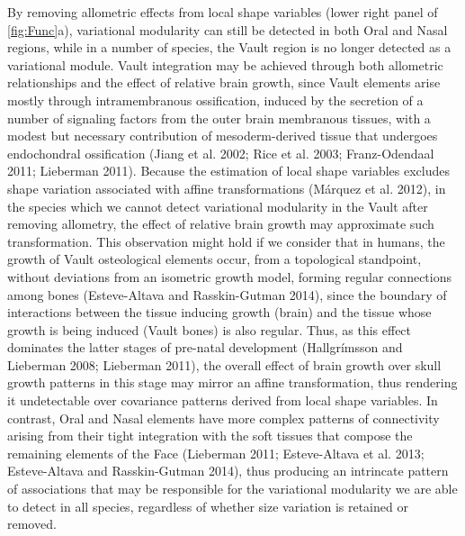 \documentclass[12pt,]{article}
\begin{document}
By removing allometric effects from local shape variables (lower right
panel of \autoref{fig:Func}a), variational modularity can still be
detected in both Oral and Nasal regions, while in a number of species,
the Vault region is no longer detected as a variational module. Vault
integration may be achieved through both allometric relationships and
the effect of relative brain growth, since Vault elements arise mostly
through intramembranous ossification, induced by the secretion of a
number of signaling factors from the outer brain membranous tissues,
with a modest but necessary contribution of mesoderm-derived tissue that
undergoes endochondral ossification (Jiang et al. 2002; Rice et al.
2003; Franz-Odendaal 2011; Lieberman 2011). Because the estimation of
local shape variables excludes shape variation associated with affine
transformations (Márquez et al. 2012), in the species which we cannot
detect variational modularity in the Vault after removing allometry, the
effect of relative brain growth may approximate such transformation.
This observation might hold if we consider that in humans, the growth of
Vault osteological elements occur, from a topological standpoint,
without deviations from an isometric growth model, forming regular
connections among bones (Esteve-Altava and Rasskin-Gutman 2014), since
the boundary of interactions between the tissue inducing growth (brain)
and the tissue whose growth is being induced (Vault bones) is also
regular. Thus, as this effect dominates the latter stages of pre-natal
development (Hallgrímsson and Lieberman 2008; Lieberman 2011), the
overall effect of brain growth over skull growth patterns in this stage
may mirror an affine transformation, thus rendering it undetectable over
covariance patterns derived from local shape variables. In contrast,
Oral and Nasal elements have more complex patterns of connectivity
arising from their tight integration with the soft tissues that compose
the remaining elements of the Face (Lieberman 2011; Esteve-Altava et al.
2013; Esteve-Altava and Rasskin-Gutman 2014), thus producing an
intrincate pattern of associations that may be responsible for the
variational modularity we are able to detect in all species, regardless
of whether size variation is retained or removed.
\end{document}
